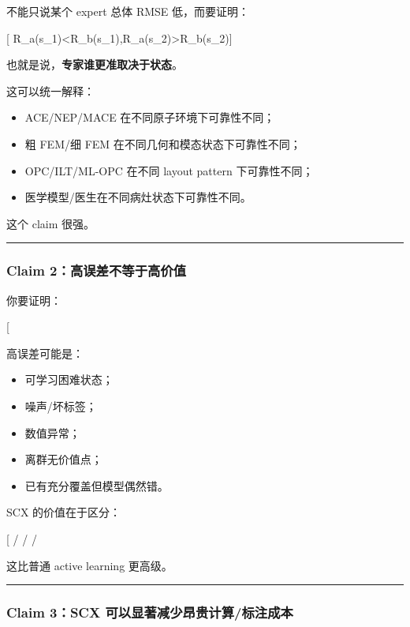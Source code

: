 \documentclass[
  12pt,
]{ctexart}
\providecommand{\tightlist}{%
  \setlength{\itemsep}{0pt}\setlength{\parskip}{0pt}}
\begin{document}
不能只说某个 expert 总体 RMSE 低，而要证明：

{[}
R\_a(s\_1)\textless R\_b(s\_1),\quad R\_a(s\_2)\textgreater R\_b(s\_2){]}

也就是说，\textbf{专家谁更准取决于状态}。

这可以统一解释：

\begin{itemize}
\tightlist
\item
  ACE/NEP/MACE 在不同原子环境下可靠性不同；
\item
  粗 FEM/细 FEM 在不同几何和模态状态下可靠性不同；
\item
  OPC/ILT/ML-OPC 在不同 layout pattern 下可靠性不同；
\item
  医学模型/医生在不同病灶状态下可靠性不同。
\end{itemize}

这个 claim 很强。

\begin{center}\rule{0.5\linewidth}{0.5pt}\end{center}

\subsubsection{Claim
2：高误差不等于高价值}\label{claim-2ux9ad8ux8befux5deeux4e0dux7b49ux4e8eux9ad8ux4ef7ux503c}

你要证明：

{[}  \neq \text{valuable data}{]}

高误差可能是：

\begin{itemize}
\tightlist
\item
  可学习困难状态；
\item
  噪声/坏标签；
\item
  数值异常；
\item
  离群无价值点；
\item
  已有充分覆盖但模型偶然错。
\end{itemize}

SCX 的价值在于区分：

{[}  /  /  /
\text{expert-dependent}{]}

这比普通 active learning 更高级。

\begin{center}\rule{0.5\linewidth}{0.5pt}\end{center}

\subsubsection{Claim 3：SCX
可以显著减少昂贵计算/标注成本}\label{claim-3scx-ux53efux4ee5ux663eux8457ux51cfux5c11ux6602ux8d35ux8ba1ux7b97ux6807ux6ce8ux6210ux672c}
\end{document}
